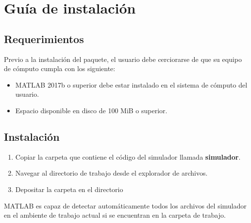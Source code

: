 \chapter{Guía de instalación}

\section{Requerimientos}
Previo a la instalación del paquete, el usuario debe cerciorarse de que su 
equipo de cómputo cumpla con los siguiente:

\begin{itemize}
 \item MATLAB 2017b o superior debe estar instalado en el sistema de cómputo del 
usuario.
 \item Espacio disponible en disco de 100 MiB o superior.
\end{itemize}


\section{Instalación}
\begin{enumerate}
 \item Copiar la carpeta que contiene el código del simulador llamada \textbf{simulador}.
 \item Navegar al directorio de trabajo desde el explorador de archivos.
 \item Depositar la carpeta en el directorio
\end{enumerate}

MATLAB es capaz de detectar automáticamente todos los archivos del simulador en 
el ambiente de trabajo actual si se encuentran en la carpeta de trabajo.
